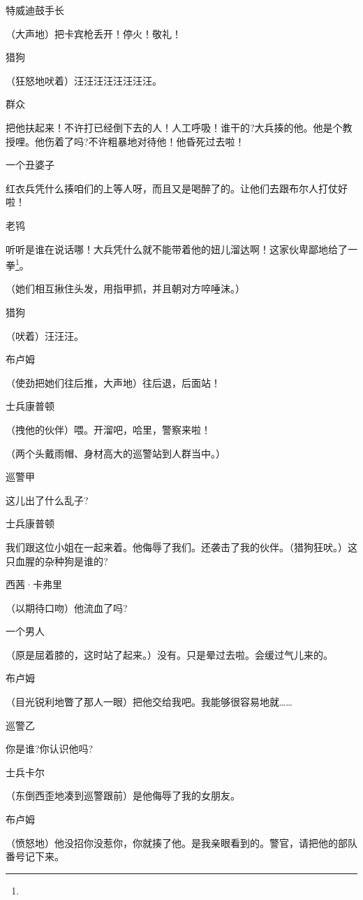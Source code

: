 \par 特威迪鼓手长
\par （大声地）把卡宾枪丢开！停火！敬礼！
\par 猎狗
\par （狂怒地吠着）汪汪汪汪汪汪汪汪。
\par 群众
\par 把他扶起来！不许打已经倒下去的人！人工呼吸！谁干的?大兵揍的他。他是个教授哩。他伤着了吗?不许粗暴地对待他！他昏死过去啦！
\par 一个丑婆子
\par 红衣兵凭什么揍咱们的上等人呀，而且又是喝醉了的。让他们去跟布尔人打仗好啦！
\par 老鸨
\par 听听是谁在说话哪！大兵凭什么就不能带着他的妞儿溜达啊！这家伙卑鄙地给了一拳\footnote{}。
\par （她们相互揪住头发，用指甲抓，并且朝对方啐唾沫。）
\par 猎狗
\par （吠着）汪汪汪。
\par 布卢姆
\par （使劲把她们往后推，大声地）往后退，后面站！
\par 士兵康普顿
\par （拽他的伙伴）喂。开溜吧，哈里，警察来啦！
\par （两个头戴雨帽、身材高大的巡警站到人群当中。）
\par 巡警甲
\par 这儿出了什么乱子?
\par 士兵康普顿
\par 我们跟这位小姐在一起来着。他侮辱了我们。还袭击了我的伙伴。（猎狗狂吠。）这只血腥的杂种狗是谁的?
\par 西茜·卡弗里
\par （以期待口吻）他流血了吗?
\par 一个男人
\par （原是屈着膝的，这时站了起来。）没有。只是晕过去啦。会缓过气儿来的。
\par 布卢姆
\par （目光锐利地瞥了那人一眼）把他交给我吧。我能够很容易地就……
\par 巡警乙
\par 你是谁?你认识他吗?
\par 士兵卡尔
\par （东倒西歪地凑到巡警跟前）是他侮辱了我的女朋友。
\par 布卢姆
\par （愤怒地）他没招你没惹你，你就揍了他。是我亲眼看到的。警官，请把他的部队番号记下来。
